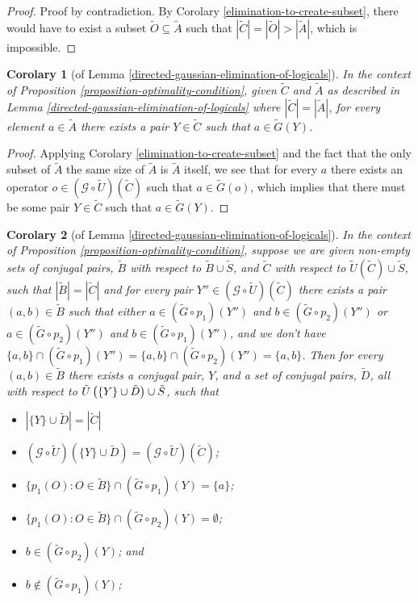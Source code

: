 \documentclass[twocolumn,showpacs,preprintnumbers,amsmath,amssymb,nofootinbib,pra,floatfix]{revtex4-1}
\newtheorem{corolary}{Corolary}
\newcommand{\set}{\tilde}
\newcommand{\genfun}{\mathcal{G}}
\begin{document}
\begin{proof}
Proof by contradiction.  By Corolary \ref{elimination-to-create-subset}, there would have to exist a subset $\set O\subseteq\set A$ such that $|\set C|=|\set O|>|\set A|$, which is impossible.
\end{proof}
\begin{corolary}[of Lemma \ref{directed-gaussian-elimination-of-logicals}]
\label{all-are-present}
In the context of Proposition \ref{proposition-optimality-condition}, given $\set C$ and $\set A$ as described in Lemma \ref{directed-gaussian-elimination-of-logicals} where $|\set C|=|\set A|$, for every element $a\in\set A$ there exists a pair $Y\in\set C$ such that $a\in\set G(Y)$.
\end{corolary}

\begin{proof}
Applying Corolary \ref{elimination-to-create-subset} and the fact that the only subset of $\set A$ the same size of $\set A$ is $\set A$ itself, we see that for every $a$ there exists an operator $o\in(\genfun\circ\set U)(\set C)$ such that $a\in\set G(o)$, which implies that there must be some pair $Y\in\set C$ such that $a\in\set G(Y)$.
\end{proof}
\begin{corolary}[of Lemma \ref{directed-gaussian-elimination-of-logicals}]
\label{elimination-to-isolate}
In the context of Proposition \ref{proposition-optimality-condition}, suppose we are given non-empty sets of conjugal pairs, $\set B$ with respect to $\set B\cup\set S$, and $\set C$ with respect to $\set U(\set C)\cup\set S$, such that $|\set B|=|\set C|$ and for every pair $Y''\in(\genfun\circ\set U)(\set C)$ there exists a pair $(a,b)\in\set B$ such that either $a\in (\set G\circ p_1)(Y'')$ and $b\in (\set G\circ p_2)(Y'')$ or $a\in (\set G\circ p_2)(Y'')$ and $b\in (\set G\circ p_1)(Y'')$, and we don't have $\{a,b\}\cap(\set G\circ p_1)(Y'')=\{a,b\}\cap(\set G\circ p_2)(Y'')=\{a,b\}$.  Then for every $(a,b)\in\set B$ there exists a conjugal pair, $Y$, and a set of conjugal pairs, $\set D$, all with respect to $\set U\paren{\{Y\}\cup\set D}\cup\set S$, such that
\begin{itemize}
\item $|\{Y\}\cup \set D| = |\set C|$
\item $(\genfun\circ\set U)(\{Y\}\cup \set D)=(\genfun\circ\set U)(\set C)$;
\item $\{p_1(O):O\in\set B\}\cap (\set G\circ p_1)(Y)=\{a\}$;
\item $\{p_1(O):O\in\set B\}\cap (\set G\circ p_2)(Y)=\emptyset$;
\item $b\in (\set G\circ p_2)(Y)$; and
\item $b\notin (\set G\circ p_1)(Y)$;
\end{itemize}
\end{corolary}
\end{document}
